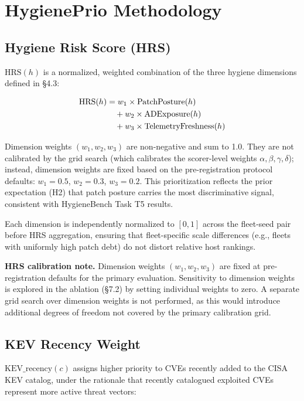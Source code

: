 \section{HygienePrio Methodology}

\subsection{Hygiene Risk Score (HRS)}

$\mathrm{HRS}(h)$ is a normalized, weighted combination of the three hygiene dimensions defined in \S4.3:

\begin{align}
 \mathrm{HRS}(h) &= w_1 \times \mathrm{PatchPosture}(h) \notag\\
 &\quad+ w_2 \times \mathrm{ADExposure}(h) \notag\\
 &\quad+ w_3 \times \mathrm{TelemetryFreshness}(h)
 \label{eq:hrs}
\end{align}

Dimension weights $(w_1, w_2, w_3)$ are non-negative and sum to 1.0. They are not calibrated by the grid search (which calibrates the scorer-level weights $\alpha, \beta, \gamma, \delta$); instead, dimension weights are fixed based on the pre-registration protocol defaults: $w_1 = 0.5$, $w_2 = 0.3$, $w_3 = 0.2$. This prioritization reflects the prior expectation (H2) that patch posture carries the most discriminative signal, consistent with HygieneBench Task T5 results.

Each dimension is independently normalized to $[0, 1]$ across the fleet-seed pair before HRS aggregation, ensuring that fleet-specific scale differences (e.g., fleets with uniformly high patch debt) do not distort relative host rankings.

\textbf{HRS calibration note.} Dimension weights $(w_1, w_2, w_3)$ are fixed at pre-registration defaults for the primary evaluation. Sensitivity to dimension weights is explored in the ablation (\S7.2) by setting individual weights to zero. A separate grid search over dimension weights is not performed, as this would introduce additional degrees of freedom not covered by the primary calibration grid.

\subsection{KEV Recency Weight}

$\mathrm{KEV\_recency}(c)$ assigns higher priority to CVEs recently added to the CISA KEV catalog, under the rationale that recently catalogued exploited CVEs represent more active threat vectors:

